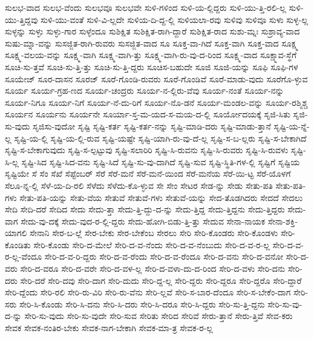{ಸುಲಭ-ವಾದ
ಸುಲಭ-ವೆಂದು
ಸುಲಭವೂ
ಸುಲಭವೇ
ಸುಳಿ-ಗಳಿಂದ
ಸುಳಿ-ಯ-ಲ್ಲಿದ್ದರು
ಸುಳಿ-ಯು-ತ್ತಿ-ರಲಿ-ಲ್ಲ
ಸುಳಿ-ಯು-ತ್ತಿದ್ದವು
ಸುಳಿ-ಯು-ವಂತೆ
ಸುಳಿ-ವಿ-ಲ್ಲದೇ
ಸುಳಿಯ-ದಿ-ದ್ದ-ಲ್ಲಿ
ಸುಳಿಯಲಾ-ರವು
ಸುಳಿವು
ಸುಳಿವೂ
ಸುಳು
ಸುಳ್ಳ-ಲ್ಲ
ಸುಳ್ಳನ್ನು
ಸುಳ್ಳು
ಸುಳ್ಳು-ಗಾರ
ಸುಳ್ಳೆಂದೂ
ಸುಶಿಕ್ಷಿತ
ಸುಶಿಕ್ಷಿತ-ರಾಗಿ-ದ್ದಾರೆ
ಸುಶಿಕ್ಷಿತ-ರಾದ
ಸುಶು-ಮ್ನಃ
ಸುಶ್ರಾವ್ಯ-ವಾದ
ಸುಷು-ಮ್ನಾ-ವನ್ನು
ಸುಸಜ್ಜಿತ-ರಾಗಿ-ರುವರು
ಸುಸಜ್ಜಿತ-ವಾದ
ಸೂ
ಸೂಕ್ತ-ವಾ-ಗಿದೆ
ಸೂಕ್ತ-ವಾಗಿ
ಸೂಕ್ತ-ವಾದ
ಸೂಕ್ಷ್ಮ
ಸೂಕ್ಷ್ಮ-ವಲಯ-ವನ್ನು
ಸೂಕ್ಷ್ಮ-ವಾಗಿ
ಸೂಕ್ಷ್ಮ-ವಾಗಿ-ತ್ತು
ಸೂಕ್ಷ್ಮ-ವಾಗಿ-ರು-ವು-ದ-ರಿಂದ
ಸೂಕ್ಷ್ಮ-ವಾದ
ಸೂಕ್ಷ್ಮಾವ-ಸ್ಥೆಗೆ
ಸೂಚಿ-ಸು-ತ್ತವೆ
ಸೂಚಿ-ಸು-ತ್ತಿ-ತ್ತು
ಸೂಚಿ-ಸು-ತ್ತಿ-ದ್ದರು
ಸೂಚಿಸ-ಬಹುದೇ
ಸೂಜಿ
ಸೂಜಿ-ಯನ್ನು
ಸೂಫಿ
ಸೂಫಿ-ಗಳ
ಸೂಯೇಜ್
ಸೂರ-ದಾಸನ
ಸೂರಜ್
ಸೂರೆ-ಗೊಂಡಿ-ರುವರು
ಸೂರೆ-ಗೊಂಡಿವೆ
ಸೂರೆ-ಮಾಡು-ವುದು
ಸೂರೆಗೊ-ಳ್ಳುವ
ಸೂರ್ಯ
ಸೂರ್ಯ-ಗ್ರಹ-ಣದ
ಸೂರ್ಯ-ಚಂದ್ರರು
ಸೂರ್ಯ-ನ-ಲ್ಲಿರು-ವೆವು
ಸೂರ್ಯ-ನಂತೆ
ಸೂರ್ಯ-ನನ್ನು
ಸೂರ್ಯ-ನಿಗೂ
ಸೂರ್ಯ-ನಿಗೆ
ಸೂರ್ಯ-ನೆ-ದು-ರಿಗೆ
ಸೂರ್ಯ-ನೊ-ಡನೆ
ಸೂರ್ಯ-ಮಂಡಲ-ವನ್ನು
ಸೂರ್ಯ-ರಶ್ಮಿಶ್ಚ
ಸೂರ್ಯನ
ಸೂರ್ಯನು
ಸೂರ್ಯನೇ
ಸೂರ್ಯಾ-ಸ್ತ-ಮ-ಯದ-ಸ-ಮಯ-ದ-ಲ್ಲಿ
ಸೂರ್ಯೋದಯಕ್ಕೆ
ಸೃಜಿ-ಸಿತು
ಸೃಜಿ-ಸು-ವುದು
ಸೃಜಿಸು-ವುದೋ
ಸೃಷ್ಟಿ
ಸೃಷ್ಟಿ-ಕರ್ತ
ಸೃಷ್ಟಿ-ಕರ್ತ-ನನ್ನು
ಸೃಷ್ಟಿ-ಮಾಡಿ-ದರು
ಸೃಷ್ಟಿ-ಮಾಡು-ತ್ತಾನೆ
ಸೃಷ್ಟಿ-ಯ-ನ್ನೆ-ಲ್ಲ
ಸೃಷ್ಟಿ-ಯ-ಲ್ಲಿ
ಸೃಷ್ಟಿ-ಯ-ಲ್ಲಿ-ರುವ
ಸೃಷ್ಟಿ-ಯಷ್ಟೇ
ಸೃಷ್ಟಿ-ಯಾಗಿ-ರು-ವು-ದೆ-ಲ್ಲ
ಸೃಷ್ಟಿ-ಸ-ಬ-ಲ್ಲರು
ಸೃಷ್ಟಿ-ಸ-ಬೇಕಾಗಿದೆ
ಸೃಷ್ಟಿ-ಸ-ಬೇಕಾಗುವುದು
ಸೃಷ್ಟಿ-ಸ-ಲ್ಪಟ್ಟುವು
ಸೃಷ್ಟಿ-ಸಲಾರಿರಿ
ಸೃಷ್ಟಿ-ಸಿ-ರುವನು
ಸೃಷ್ಟಿ-ಸಿ-ರುವರು
ಸೃಷ್ಟಿ-ಸಿ-ರುವಳು
ಸೃಷ್ಟಿ-ಸಿ-ಲ್ಲ
ಸೃಷ್ಟಿ-ಸಿದ
ಸೃಷ್ಟಿ-ಸಿದ-ವನು
ಸೃಷ್ಟಿ-ಸಿದೆ
ಸೃಷ್ಟಿ-ಸು-ವು-ದಾಗಿದೆ
ಸೃಷ್ಟಿ-ಸುವ
ಸೃಷ್ಟಿ-ಸ್ಥಿತಿ-ಗಳ-ಲ್ಲಿ
ಸೃಷ್ಟಿಗೆ
ಸೃಷ್ಟಿಯ
ಸೃಷ್ಟಿಯೇ
ಸೆ
ಸೆಂ
ಸೆಖೆ
ಸೆಪ್ಟೆಂಬರ್
ಸೆರೆ
ಸೆರೆ-ಮನೆ
ಸೆರೆ-ಮನೆ-ಯಿಂದ
ಸೆರೆ-ಮನೆಯ
ಸೆರೆ-ಯಿ-ಟ್ಟ
ಸೆರೆ-ಯೊಳಗೆ
ಸೆಲೂ-ನ್ನ-ಲ್ಲಿ
ಸೆಳೆ-ಯ-ದಿ-ರಲಿ
ಸೆಳೆದು
ಸೆಳೆದು-ಕೊ-ಳ್ಳುವ
ಸೇ
ಸೇಂ
ಸೇಟರ
ಸೇಡ-ನ್ನು
ಸೇಡು
ಸೇತು-ಪತಿ
ಸೇತು-ಪತಿ-ಗಳು
ಸೇತು-ಪತಿ-ಯನ್ನು
ಸೇತು-ವೆಯ
ಸೇತುವೆ
ಸೇತುವೆ-ಗಳು
ಸೇತುವೆ-ಯನ್ನು
ಸೇದ-ತೊಡಗಿದರು
ಸೇದದೆ
ಸೇದಲು
ಸೇದಿ
ಸೇದಿ-ದರೆ
ಸೇದಿದ
ಸೇದು
ಸೇದು-ತ್ತಾ
ಸೇದು-ತ್ತಿ-ದ್ದು-ದ-ನ್ನು
ಸೇದು-ತ್ತಿದ್ದ
ಸೇದು-ತ್ತಿದ್ದನು
ಸೇದು-ತ್ತಿದ್ದರು
ಸೇದು-ವಾಗ
ಸೇದು-ವು-ದಕ್ಕೆ
ಸೇದು-ವುದ-ರ-ಲ್ಲಿ-ದ್ದರು
ಸೇದು-ಹೋಗಿ-ಬಿಡು-ತ್ತಿ-ತ್ತು
ಸೇದುವ
ಸೇನಾ-ನಾಯಕ
ಸೇನಾ-ಶಕ್ತಿ-ಯಾಗಲಿ
ಸೇನಾನಿ
ಸೇರ-ಬ-ಲ್ಲೆ
ಸೇರ-ಬೇಕು
ಸೇರ-ಬೇಕೆಂಬ
ಸೇರಲು
ಸೇರಿ
ಸೇರಿ-ಕೊಂಡರು
ಸೇರಿ-ಕೊಂಡಳು
ಸೇರಿ-ಕೊಂಡಿತು
ಸೇರಿ-ಕೊಂಡು
ಸೇರಿ-ದ-ಮೇಲೆ
ಸೇರಿ-ದ-ವ-ನೆಂದು
ಸೇರಿ-ದ-ವ-ನೆಂಬುದು
ಸೇರಿ-ದ-ವ-ರ-ಲ್ಲ
ಸೇರಿ-ದ-ವ-ರ-ಲ್ಲ-ವೆಂದೂ
ಸೇರಿ-ದ-ವ-ರಿ-ದ್ದರು
ಸೇರಿ-ದ-ವ-ರೆಂದು
ಸೇರಿ-ದ-ವ-ರೆಂದೂ
ಸೇರಿ-ದ-ವನು
ಸೇರಿ-ದ-ವನೋ
ಸೇರಿ-ದ-ವರು
ಸೇರಿ-ದ-ವರೂ
ಸೇರಿ-ದ-ವರೇ
ಸೇರಿ-ದ-ವಳ-ಲ್ಲ
ಸೇರಿ-ದ-ವಳಾ-ದು-ದ-ರಿಂದ
ಸೇರಿ-ದ-ವಳು
ಸೇರಿ-ದನು
ಸೇರಿ-ದರು
ಸೇರಿ-ದರೆ
ಸೇರಿ-ದವು
ಸೇರಿ-ದಾಗ
ಸೇರಿ-ದುದು
ಸೇರಿ-ದ್ದ-ಲ್ಲ
ಸೇರಿ-ದ್ದರು
ಸೇರಿ-ದ್ದರೂ
ಸೇರಿ-ದ್ದರೊ
ಸೇರಿ-ದ್ದಾರೆ
ಸೇರಿ-ದ್ದೆಂದು
ಸೇರಿ-ರಲಿ
ಸೇರಿ-ರು-ವಿರಿ
ಸೇರಿ-ರು-ವೆನು
ಸೇರಿ-ಲ್ಲವೆ
ಸೇರಿ-ಸ-ಬಾರ-ದೆಂದೂ
ಸೇರಿ-ಸ-ಬೇಕೆಂ-ದಾಗ
ಸೇರಿ-ಸರು
ಸೇರಿ-ಸಿ-ಕೊಂಡು
ಸೇರಿ-ಸಿ-ದನು
ಸೇರಿ-ಸಿ-ದರು
ಸೇರಿ-ಸಿ-ದರೂ
ಸೇರಿ-ಸಿ-ದ್ದರು
ಸೇರಿ-ಸು-ತ್ತಿ-ದ್ದನು
ಸೇರಿ-ಸು-ವು-ದ-ನ್ನು
ಸೇರಿ-ಸು-ವುದು
ಸೇರಿ-ಸು-ವುದೇ
ಸೇರಿ-ಸುವ
ಸೇರಿತು
ಸೇರಿದ
ಸೇರಿವೆ
ಸೇರು-ತ್ತಾನೆ
ಸೇರು-ತ್ತಿವೆ
ಸೇವ-ಕರು
ಸೇವಕ
ಸೇವಕ-ನಂತಿರ-ಬೇಕು
ಸೇವಕ-ನಾಗ-ಬೇಕಾಗಿ
ಸೇವಕ-ಮಾ-ತ್ರ
ಸೇವಕ-ರ-ಲ್ಲ
}
